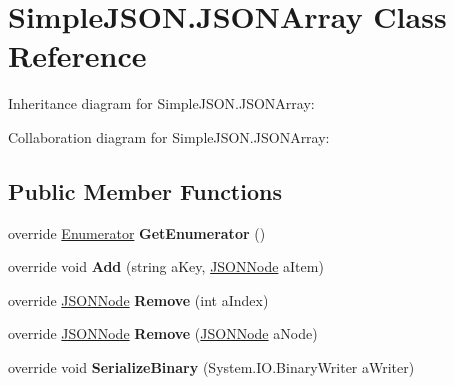 \hypertarget{classSimpleJSON_1_1JSONArray}{}\section{Simple\+J\+S\+O\+N.\+J\+S\+O\+N\+Array Class Reference}
\label{classSimpleJSON_1_1JSONArray}


Inheritance diagram for Simple\+J\+S\+O\+N.\+J\+S\+O\+N\+Array\+:


Collaboration diagram for Simple\+J\+S\+O\+N.\+J\+S\+O\+N\+Array\+:
\subsection*{Public Member Functions}
\begin{DoxyCompactItemize}
\item 
override \hyperlink{structSimpleJSON_1_1JSONNode_1_1Enumerator}{Enumerator} {\bfseries Get\+Enumerator} ()\hypertarget{classSimpleJSON_1_1JSONArray_a8424a8fd5b83488f0c91f4cd76da3c21}{}\label{classSimpleJSON_1_1JSONArray_a8424a8fd5b83488f0c91f4cd76da3c21}

\item 
override void {\bfseries Add} (string a\+Key, \hyperlink{classSimpleJSON_1_1JSONNode}{J\+S\+O\+N\+Node} a\+Item)\hypertarget{classSimpleJSON_1_1JSONArray_a9192aa5b6319426c74de7a462f123cd7}{}\label{classSimpleJSON_1_1JSONArray_a9192aa5b6319426c74de7a462f123cd7}

\item 
override \hyperlink{classSimpleJSON_1_1JSONNode}{J\+S\+O\+N\+Node} {\bfseries Remove} (int a\+Index)\hypertarget{classSimpleJSON_1_1JSONArray_aed3b61a8962499ef06e555e434d7affc}{}\label{classSimpleJSON_1_1JSONArray_aed3b61a8962499ef06e555e434d7affc}

\item 
override \hyperlink{classSimpleJSON_1_1JSONNode}{J\+S\+O\+N\+Node} {\bfseries Remove} (\hyperlink{classSimpleJSON_1_1JSONNode}{J\+S\+O\+N\+Node} a\+Node)\hypertarget{classSimpleJSON_1_1JSONArray_a6e24a51eb5e1f70b2f615399141e291b}{}\label{classSimpleJSON_1_1JSONArray_a6e24a51eb5e1f70b2f615399141e291b}

\item 
override void {\bfseries Serialize\+Binary} (System.\+I\+O.\+Binary\+Writer a\+Writer)\hypertarget{classSimpleJSON_1_1JSONArray_a6f7581453f050067695ebf2e25673a7a}{}\label{classSimpleJSON_1_1JSONArray_a6f7581453f050067695ebf2e25673a7a}

\end{DoxyCompactItemize}
